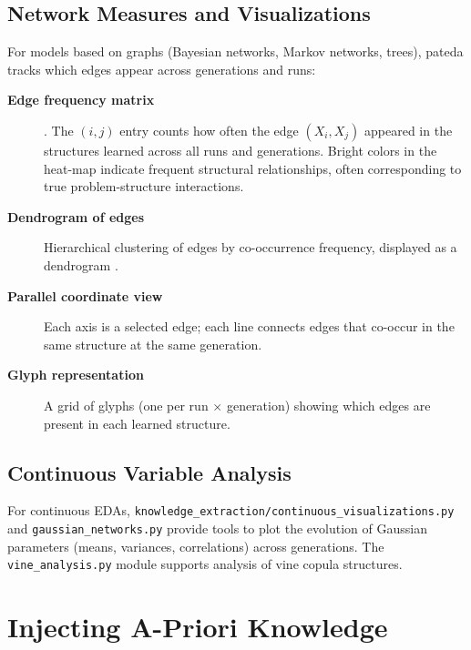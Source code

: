 \documentclass[a4paper,11pt]{article}
\begin{document}
\subsection{Network Measures and Visualizations}

For models based on graphs (Bayesian networks, Markov networks, trees),
pateda tracks which edges appear across generations and runs:

\begin{description}
  \item[\textbf{Edge frequency matrix}]
    \citep{Echegoyen_et_al:2007,Santana_et_al:2007b}.
    The $(i,j)$ entry counts how often the edge $(X_i, X_j)$ appeared
    in the structures learned across all runs and generations.  Bright
    colors in the heat-map indicate frequent structural relationships,
    often corresponding to true problem-structure interactions.

  \item[\textbf{Dendrogram of edges}]
    Hierarchical clustering of edges by co-occurrence frequency, displayed
    as a dendrogram \citep{Hauschild_and_Pelikan:2008}.

  \item[\textbf{Parallel coordinate view}]
    Each axis is a selected edge; each line connects edges that co-occur
    in the same structure at the same generation.

  \item[\textbf{Glyph representation}]
    A grid of glyphs (one per run $\times$ generation) showing which
    edges are present in each learned structure.
\end{description}

\subsection{Continuous Variable Analysis}

For continuous EDAs, \texttt{knowledge\_extraction/continuous\_visualizations.py}
and \texttt{gaussian\_networks.py} provide tools to plot the evolution of
Gaussian parameters (means, variances, correlations) across generations.
The \texttt{vine\_analysis.py} module supports analysis of vine copula structures.

\section{Injecting A-Priori Knowledge}
\label{sec:apriori}
\end{document}
